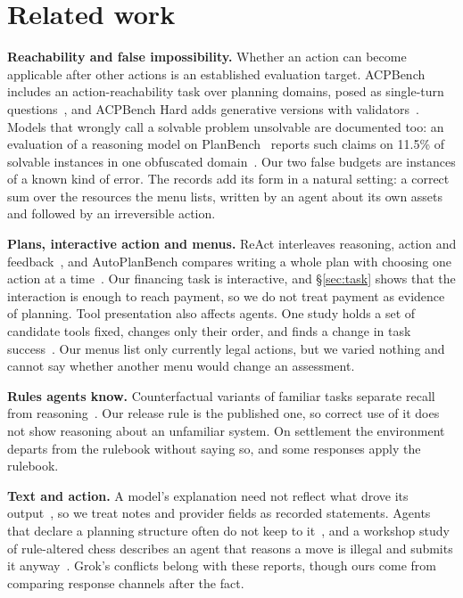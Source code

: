 \section{Related work}
\label{sec:related}

\textbf{Reachability and false impossibility.} Whether an action can become applicable after other actions is an established evaluation target. ACPBench includes an action-reachability task over planning domains, posed as single-turn questions~\cite{kokel2025acpbench}, and ACPBench Hard adds generative versions with validators~\cite{kokel2026acpbenchhard}. Models that wrongly call a solvable problem unsolvable are documented too: an evaluation of a reasoning model on PlanBench~\cite{valmeekam2023planbench} reports such claims on 11.5\% of solvable instances in one obfuscated domain~\cite{valmeekam2024lrm}. Our two false budgets are instances of a known kind of error. The records add its form in a natural setting: a correct sum over the resources the menu lists, written by an agent about its own assets and followed by an irreversible action.

\textbf{Plans, interactive action and menus.} ReAct interleaves reasoning, action and feedback~\cite{yao2023react}, and AutoPlanBench compares writing a whole plan with choosing one action at a time~\cite{stein2025autoplanbench}. Our financing task is interactive, and \S\ref{sec:task} shows that the interaction is enough to reach payment, so we do not treat payment as evidence of planning. Tool presentation also affects agents. One study holds a set of candidate tools fixed, changes only their order, and finds a change in task success~\cite{yan2026menu}. Our menus list only currently legal actions, but we varied nothing and cannot say whether another menu would change an assessment.

\textbf{Rules agents know.} Counterfactual variants of familiar tasks separate recall from reasoning~\cite{wu2024reciting}. Our release rule is the published one, so correct use of it does not show reasoning about an unfamiliar system. On settlement the environment departs from the rulebook without saying so, and some responses apply the rulebook.

\textbf{Text and action.} A model's explanation need not reflect what drove its output~\cite{turpin2023unfaithful,lanham2023faithfulness}, so we treat notes and provider fields as recorded statements. Agents that declare a planning structure often do not keep to it~\cite{oota2026declare}, and a workshop study of rule-altered chess describes an agent that reasons a move is illegal and submits it anyway~\cite{co2026atomic}. Grok's conflicts belong with these reports, though ours come from comparing response channels after the fact.

